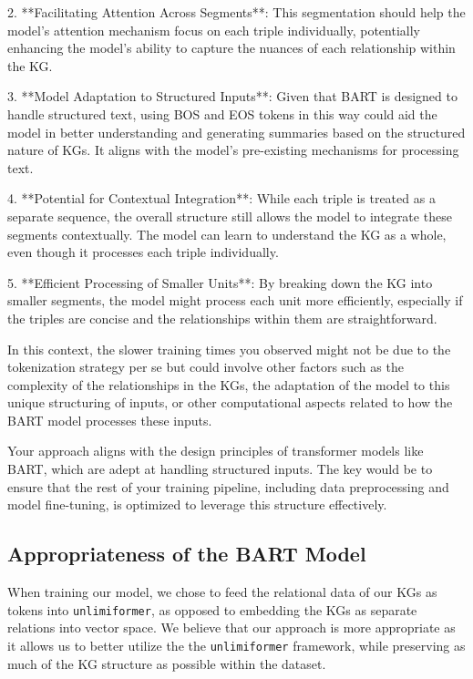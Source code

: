 \documentclass[12pt]{article}
\begin{document}
2. **Facilitating Attention Across Segments**: This segmentation should help the model's attention mechanism focus on each triple individually, potentially enhancing the model's ability to capture the nuances of each relationship within the KG.

3. **Model Adaptation to Structured Inputs**: Given that BART is designed to handle structured text, using BOS and EOS tokens in this way could aid the model in better understanding and generating summaries based on the structured nature of KGs. It aligns with the model's pre-existing mechanisms for processing text.

4. **Potential for Contextual Integration**: While each triple is treated as a separate sequence, the overall structure still allows the model to integrate these segments contextually. The model can learn to understand the KG as a whole, even though it processes each triple individually.

5. **Efficient Processing of Smaller Units**: By breaking down the KG into smaller segments, the model might process each unit more efficiently, especially if the triples are concise and the relationships within them are straightforward.

In this context, the slower training times you observed might not be due to the tokenization strategy per se but could involve other factors such as the complexity of the relationships in the KGs, the adaptation of the model to this unique structuring of inputs, or other computational aspects related to how the BART model processes these inputs.

Your approach aligns with the design principles of transformer models like BART, which are adept at handling structured inputs. The key would be to ensure that the rest of your training pipeline, including data preprocessing and model fine-tuning, is optimized to leverage this structure effectively.

\subsection*{Appropriateness of the BART Model}
When training our model, we chose to feed the relational data of our KGs as tokens into \texttt{unlimiformer}, as opposed to embedding the KGs as separate relations into vector space. We believe that our approach is more appropriate as it allows us to better utilize the the \texttt{unlimiformer} framework, while preserving as much of the KG structure as possible within the dataset.
\end{document}

